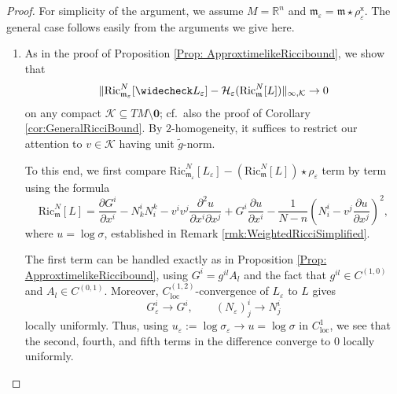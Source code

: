 \documentclass[a4paper,11pt]{article}
\numberwithin{equation}{section}
\theoremstyle{definition}
\theoremstyle{plain}
\newcommand{\eps}{\varepsilon}
\newcommand{\Ric}{\mathrm{Ric}}
\newcommand{\m}{\mathfrak m}
\newcommand{\loc}{\mathrm{loc}}
\begin{document}
\begin{proof}
For simplicity of the argument, we assume $M = \mathbb R^n$ and $\m_\varepsilon = \m \star \rho^\mathsf x_\varepsilon$. The general case follows easily from the arguments we give here.
\begin{enumerate}
\item As in the proof of Proposition \ref{Prop: ApproxtimelikeRiccibound}, we show that
\begin{equation}
\label{eq:ProofWeightedRicci}
    \| \Ric_{\m_\eps}^N[\widecheck L_\eps] - \mathcal H_\varepsilon(\Ric_{\m}^N[L]) \|_{\infty, \mathcal{K}} \rightarrow 0
\end{equation}
on any compact $\mathcal K\subseteq TM\setminus\mathbf 0$; cf.\ also the proof of Corollary \ref{cor:GeneralRicciBound}. By $2$-homogeneity, it suffices to restrict our attention to $v \in \mathcal K$ having unit $\tilde g$-norm. 

To this end, we first compare $\Ric_{\m_\eps}^N[L_\eps] - (\Ric_{\m}^N[L])\star \rho_\eps$ term by term using the formula 
\begin{equation*}
    \Ric_{\m}^N[L] =\frac{\partial G^i}{\partial x^i} - N^i_kN^k_i- v^iv^j\frac{\partial^2 u}{\partial x^i\partial x^j} + G^i\frac{\partial u}{\partial x^i} -\frac{1}{N-n}\left(N^i_i-v^j\frac{\partial u}{\partial x^j}\right)^2,
\end{equation*}
where $u=\log \sigma$, established in Remark \ref{rmk:WeightedRicciSimplified}.

The first term can be handled exactly as in Proposition \ref{Prop: ApproxtimelikeRiccibound}, using $G^i = g^{il} A_l$ and the fact that $g^{il} \in C^{(1,0)}$ and $A_l \in C^{(0,1)}$. 
Moreover, $C^{(1,2)}_\loc$-convergence of $L_\eps$ to $L$ gives
\begin{equation*}
    G^i_\eps \rightarrow G^i, \qquad (N_\eps)^i_j \rightarrow N^i_j
\end{equation*}
locally uniformly.
Thus, using $u_\eps := \log \sigma_\eps \rightarrow u = \log \sigma$ in $C^1_\loc$, we see that the second, fourth, and fifth terms in the difference converge to $0$ locally uniformly.


\end{enumerate}
\end{proof}
\end{document}
